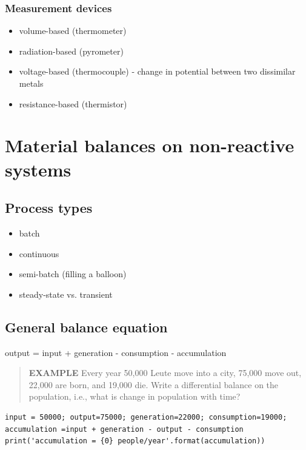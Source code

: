 \documentclass[11pt]{article}
\begin{document}
\subsubsection{Measurement devices}
\label{sec-4-7-2}
\begin{itemize}
\item volume-based (thermometer)
\item radiation-based (pyrometer)
\item voltage-based (thermocouple) - change in potential between two dissimilar metals
\item resistance-based (thermistor)
\end{itemize}


\newpage
\section{Material balances on non-reactive systems}
\label{sec-5}
\subsection{Process types}
\label{sec-5-1}
\begin{itemize}
\item batch
\item continuous
\item semi-batch (filling a balloon)
\item steady-state vs. transient
\end{itemize}

\subsection{General balance equation}
\label{sec-5-2}
\begin{framed}
output = input + generation - consumption - accumulation
\end{framed}

\begin{quote}
\textbf{EXAMPLE} Every year 50,000 Leute move into a city, 75,000 move out, 22,000 are born, and 19,000 die.  Write a differential balance on the population, i.e., what is change in population with time?
\end{quote}
\begin{verbatim}
input = 50000; output=75000; generation=22000; consumption=19000;
accumulation =input + generation - output - consumption
print('accumulation = {0} people/year'.format(accumulation))
\end{verbatim}
\end{document}
